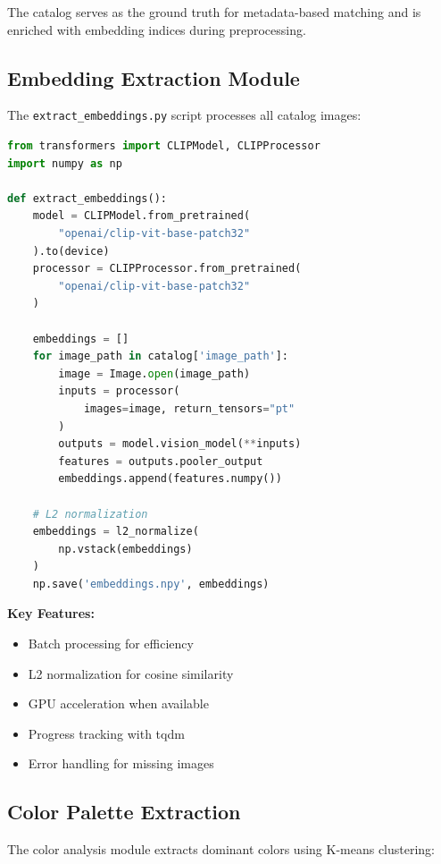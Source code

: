 \documentclass[12pt,a4paper]{report}
\begin{document}
The catalog serves as the ground truth for metadata-based matching and is enriched with embedding indices during preprocessing.

\subsection{Embedding Extraction Module}

The \texttt{extract\_embeddings.py} script processes all catalog images:

\begin{lstlisting}[language=Python]
from transformers import CLIPModel, CLIPProcessor
import numpy as np

def extract_embeddings():
    model = CLIPModel.from_pretrained(
        "openai/clip-vit-base-patch32"
    ).to(device)
    processor = CLIPProcessor.from_pretrained(
        "openai/clip-vit-base-patch32"
    )
    
    embeddings = []
    for image_path in catalog['image_path']:
        image = Image.open(image_path)
        inputs = processor(
            images=image, return_tensors="pt"
        )
        outputs = model.vision_model(**inputs)
        features = outputs.pooler_output
        embeddings.append(features.numpy())
    
    # L2 normalization
    embeddings = l2_normalize(
        np.vstack(embeddings)
    )
    np.save('embeddings.npy', embeddings)
\end{lstlisting}

\textbf{Key Features:}
\begin{itemize}
    \item Batch processing for efficiency
    \item L2 normalization for cosine similarity
    \item GPU acceleration when available
    \item Progress tracking with tqdm
    \item Error handling for missing images
\end{itemize}

\subsection{Color Palette Extraction}

The color analysis module extracts dominant colors using K-means clustering:
\end{document}
